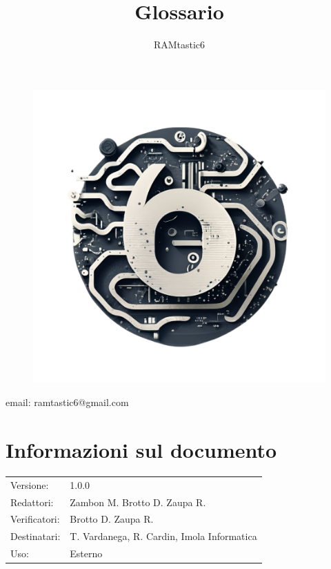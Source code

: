 \documentclass[12pt, oneside]{article}
\author{RAMtastic6}
\begin{document}
\thispagestyle{empty}
\title{Glossario}
\maketitle
\begin{figure}[h]
  \centering
  \includegraphics[scale=0.3]{logo.png}
\end{figure}
\begin{center}
    email: ramtastic6@gmail.com
\end{center}

\section*{Informazioni sul documento}
\begin{tabular}{ll}
Versione: & 1.0.0 \\
Redattori:  & Zambon M. Brotto D. Zaupa R.\\
Verificatori: & Brotto D. Zaupa R.\\ 
Destinatari: & T. Vardanega, R. Cardin, Imola Informatica \\
Uso: & Esterno
\end{tabular}
\newpage

\end{document}
